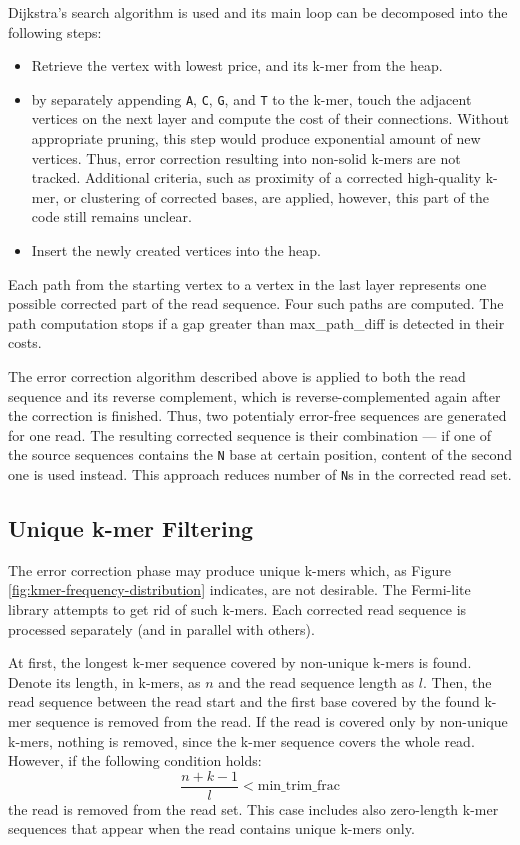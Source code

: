 Dijkstra's search algorithm is used and its main loop can be decomposed into the following steps:
\begin{itemize}
\item Retrieve the vertex with lowest price, and its k-mer from the heap.
\item by separately appending \texttt{A}, \texttt{C}, \texttt{G}, and \texttt{T} to the k-mer, touch the adjacent vertices on the next layer and compute the cost of their connections. Without appropriate pruning, this step would produce exponential amount of new vertices. Thus, error correction resulting into non-solid k-mers are not tracked. Additional criteria, such as proximity of a corrected high-quality k-mer, or clustering of corrected bases, are applied, however, this part of the code still remains unclear.
\item Insert the newly created vertices into the heap.
\end{itemize}

Each path from the starting vertex to a vertex in the last layer represents one possible corrected part of the read sequence. Four such paths are computed. The path computation stops if a gap greater than max\_path\_diff is detected in their costs.

The error correction algorithm described above is applied to both the read sequence and its reverse complement, which is reverse-complemented again after the correction is finished. Thus, two potentialy error-free sequences are generated for one read. The resulting corrected sequence is their combination --- if one of the source sequences contains the \texttt{N} base at certain position, content of the second one is used instead. This approach reduces number of \texttt{N}s in the corrected read set.

\subsection{Unique k-mer Filtering}
\label{subsec:fermi-unique-kmer-filtering}

The error correction phase may produce unique k-mers which, as Figure \ref{fig:kmer-frequency-distribution} indicates, are not desirable. The Fermi-lite library attempts to get rid of such k-mers. Each corrected read sequence is processed separately (and in parallel with others). 

At first, the longest k-mer sequence covered by non-unique k-mers is found. Denote its length, in k-mers, as $n$ and the read sequence length as $l$. Then, the read sequence between the read start and the first base covered by the found k-mer sequence is removed from the read. If the read is covered only by non-unique k-mers, nothing is removed, since the k-mer sequence covers the whole read. However, if the following condition holds:
$$
\frac{n + k - 1}{l} < \text{min\_trim\_frac}
$$
the read is removed from the read set. This case includes also zero-length k-mer sequences that appear when the read contains unique k-mers only.